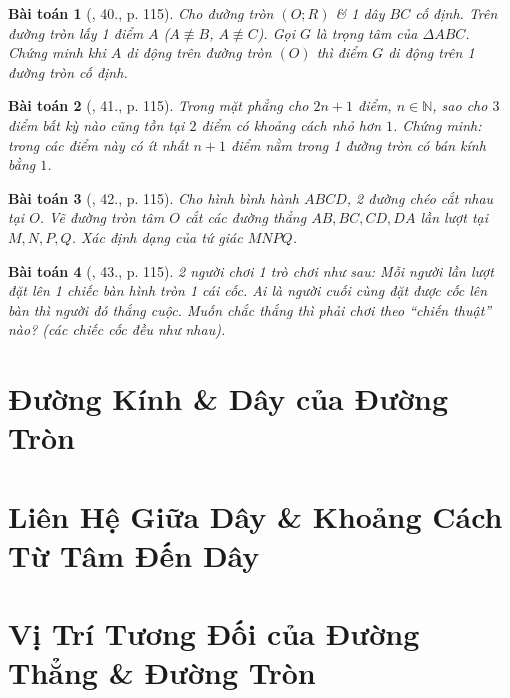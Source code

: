\documentclass{article}
\newtheorem{baitoan}{Bài toán}
\begin{document}
\begin{baitoan}[\cite{Tuyen_Toan_9}, 40., p. 115]
	Cho đường tròn $(O;R)$ \& 1 dây $BC$ cố định. Trên đường tròn lấy 1 điểm $A$ ($A\not\equiv B$, $A\not\equiv C$). Gọi $G$ là trọng tâm của $\Delta ABC$. Chứng minh khi $A$ di động trên đường tròn $(O)$ thì điểm $G$ di động trên 1 đường tròn cố định.
\end{baitoan}

\begin{baitoan}[\cite{Tuyen_Toan_9}, 41., p. 115]
	Trong mặt phẳng cho $2n + 1$ điểm, $n\in\mathbb{N}$, sao cho $3$ điểm bất kỳ nào cũng tồn tại $2$ điểm có khoảng cách nhỏ hơn $1$. Chứng minh: trong các điểm này có ít nhất $n + 1$ điểm nằm trong 1 đường tròn có bán kính bằng $1$.
\end{baitoan}

\begin{baitoan}[\cite{Tuyen_Toan_9}, 42., p. 115]
	Cho hình bình hành $ABCD$, 2 đường chéo cắt nhau tại $O$. Vẽ đường tròn tâm $O$ cắt các đường thẳng $AB,BC,CD,DA$ lần lượt tại $M,N,P,Q$. Xác định dạng của tứ giác $MNPQ$.
\end{baitoan}

\begin{baitoan}[\cite{Tuyen_Toan_9}, 43., p. 115]
	2 người chơi 1 trò chơi như sau: Mỗi người lần lượt đặt lên 1 chiếc bàn hình tròn 1 cái cốc. Ai là người cuối cùng đặt được cốc lên bàn thì người đó thắng cuộc. Muốn chắc thắng thì phải chơi theo ``chiến thuật'' nào? (các chiếc cốc đều như nhau).
\end{baitoan}


\section{Đường Kính \& Dây của Đường Tròn}


\section{Liên Hệ Giữa Dây \& Khoảng Cách Từ Tâm Đến Dây}


\section{Vị Trí Tương Đối của Đường Thẳng \& Đường Tròn}
\end{document}

